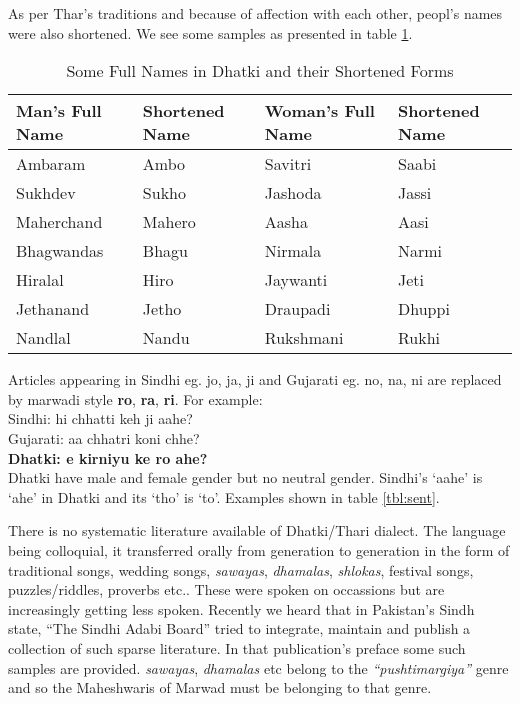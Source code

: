 As per Thar's traditions and because of affection with each other, peopl's names were also shortened. We see some samples as presented in table \ref{tbl:names}.
\begin{table}
\begin{center}
\begin{tabular}{l|l|l|l}
\hline
\textbf{Man's Full Name}  & \textbf{Shortened Name} & \textbf{Woman's Full Name} & \textbf{Shortened Name} \\
\hline
Ambaram & Ambo & Savitri & Saabi\\
Sukhdev & Sukho & Jashoda & Jassi\\
Maherchand & Mahero & Aasha & Aasi\\
Bhagwandas & Bhagu & Nirmala & Narmi\\
Hiralal & Hiro & Jaywanti & Jeti\\
Jethanand & Jetho & Draupadi & Dhuppi\\
Nandlal & Nandu & Rukshmani & Rukhi\\
\hline
\end{tabular}
\end{center}
\caption{Some Full Names in Dhatki and their Shortened Forms}
\label{tbl:names}
\end{table}
Articles appearing in Sindhi eg. jo, ja, ji and Gujarati eg. no, na, ni are replaced by marwadi style \textbf{ro}, \textbf{ra}, \textbf{ri}. For example:\\

Sindhi: hi chhatti keh ji aahe?\\
Gujarati: aa chhatri koni chhe?\\
\textbf{Dhatki: e kirniyu ke ro ahe?}\\

Dhatki have male and female gender but no neutral gender. Sindhi's `aahe' is `ahe' in Dhatki and its `tho' is `to'. Examples shown in table \ref{tbl:sent}.

There is no systematic literature available of Dhatki/Thari dialect. The language being colloquial, it transferred orally from generation to generation in the form of traditional songs, wedding songs, \textit{sawayas}, \textit{dhamalas}, \textit{shlokas}, festival songs, puzzles/riddles, proverbs etc.. These were spoken on occassions but are increasingly getting less spoken. Recently we heard that in Pakistan's Sindh state, ``The Sindhi Adabi Board'' tried to integrate, maintain and publish a collection of such sparse literature. In that publication's preface some such samples are provided. \textit{sawayas}, \textit{dhamalas} etc belong to the \textit{``pushtimargiya''} genre and so the Maheshwaris of Marwad must be belonging to that genre.


